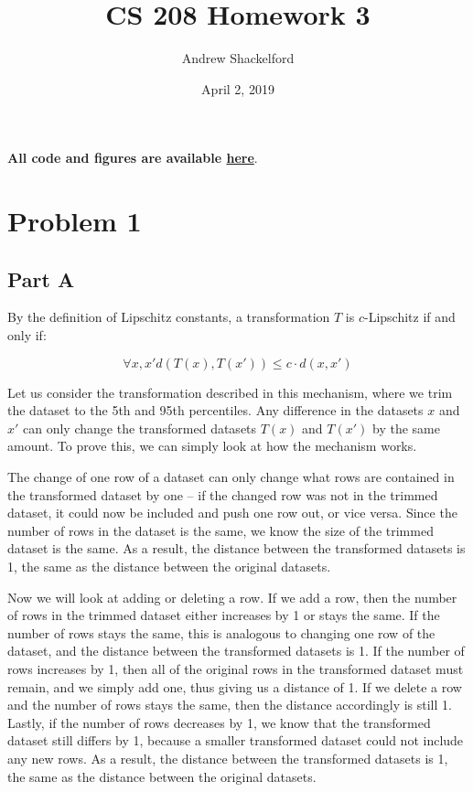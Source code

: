\documentclass[12pt]{article}
\title{CS 208 Homework 3}
\author{Andrew Shackelford}
\date{April 2, 2019}
\begin{document}
\maketitle

\textbf{All code and figures are available \href{https://github.com/andrew-shackelford/cs208/tree/master/3}{here}}.

{
  \hypersetup{linkcolor=black, hidelinks}
  \tableofcontents
}

\newpage

\section{Problem 1}

\subsection{Part A}

\noindent

By the definition of Lipschitz constants, a transformation $T$ is $c$-Lipschitz if and only if:

$$\forall x, x' d(T(x), T(x')) \leq c \cdot d(x, x')$$

Let us consider the transformation described in this mechanism, where we trim the dataset to the 5th and 95th percentiles. Any difference in the datasets $x$ and $x'$ can only change the transformed datasets $T(x)$ and $T(x')$ by the same amount. To prove this, we can simply look at how the mechanism works.

\medskip

The change of one row of a dataset can only change what rows are contained in the transformed dataset by one -- if the changed row was not in the trimmed dataset, it could now be included and push one row out, or vice versa. Since the number of rows in the dataset is the same, we know the size of the trimmed dataset is the same. As a result, the distance between the transformed datasets is 1, the same as the distance between the original datasets.

\medskip

Now we will look at adding or deleting a row. If we add a row, then the number of rows in the trimmed dataset either increases by 1 or stays the same. If the number of rows stays the same, this is analogous to changing one row of the dataset, and the distance between the transformed datasets is 1. If the number of rows increases by 1, then all of the original rows in the transformed dataset must remain, and we simply add one, thus giving us a distance of 1. If we delete a row and the number of rows stays the same, then the distance accordingly is still 1. Lastly, if the number of rows decreases by 1, we know that the transformed dataset still differs by 1, because a smaller transformed dataset could not include any new rows. As a result, the distance between the transformed datasets is 1, the same as the distance between the original datasets.
\end{document}
